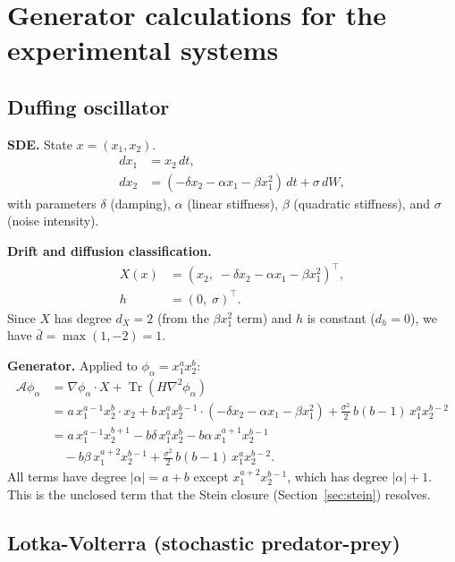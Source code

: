 \documentclass{article}
\newcommand{\Tr}{\operatorname{Tr}}
\theoremstyle{definition}
\begin{document}
\section{Generator calculations for the experimental systems}
\label{app:generators}

\subsection{Duffing oscillator}

\textbf{SDE.}
State $x = (x_1, x_2)$.
\begin{align}
    dx_1 &= x_2\, dt, \nonumber\\
    dx_2 &= (-\delta x_2 - \alpha x_1 - \beta x_1^2)\, dt
           + \sigma\, dW,
\end{align}
with parameters $\delta$ (damping), $\alpha$ (linear stiffness),
$\beta$ (quadratic stiffness), and $\sigma$ (noise intensity).

\textbf{Drift and diffusion classification.}
\begin{align}
    X(x) &= (x_2,\; -\delta x_2 - \alpha x_1 - \beta x_1^2)^\top,
    \nonumber\\
    h &= (0,\; \sigma)^\top.
\end{align}
Since $X$ has degree $d_X = 2$ (from the $\beta x_1^2$ term)
and $h$ is constant ($d_h = 0$), we have
$\bar{d} = \max(1, -2) = 1$.

\textbf{Generator.}
Applied to $\phi_\alpha = x_1^a x_2^b$:
\begin{align}
    \mathcal{A}\phi_\alpha
    &= \nabla\phi_\alpha \cdot X + \Tr(H\nabla^2\phi_\alpha)
    \nonumber\\
    &= a\, x_1^{a-1} x_2^b \cdot x_2
    + b\, x_1^a x_2^{b-1} \cdot
    (-\delta x_2 - \alpha x_1 - \beta x_1^2)
    + \frac{\sigma^2}{2}\, b(b{-}1)\, x_1^a x_2^{b-2}
    \nonumber\\
    &= a\, x_1^{a-1} x_2^{b+1}
    - b\delta\, x_1^a x_2^b
    - b\alpha\, x_1^{a+1} x_2^{b-1}
    \nonumber\\
    &\quad
    - b\beta\, x_1^{a+2} x_2^{b-1}
    + \frac{\sigma^2}{2}\, b(b{-}1)\, x_1^a x_2^{b-2}.
\end{align}
All terms have degree $|\alpha| = a + b$ except
$x_1^{a+2} x_2^{b-1}$, which has degree $|\alpha| + 1$.
This is the unclosed term that the Stein closure
(Section~\ref{sec:stein}) resolves.

\subsection{Lotka-Volterra (stochastic predator-prey)}
\end{document}
